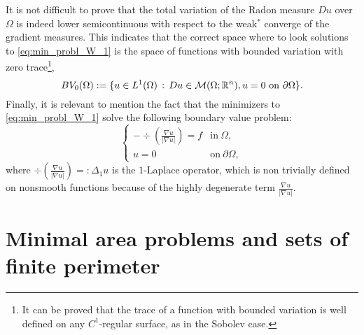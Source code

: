 It is not difficult to prove that the total variation of the Radon measure $Du$ over $\Omega$ is indeed lower semicontinuous with respect to the weak$^*$ converge of the gradient measures. This indicates that the correct space where to look solutions to \eqref{eq:min_probl_W_1} is the space of functions with bounded variation with zero trace\footnote{It can be proved that the trace of a function with bounded variation is well defined on any $C^{1}$-regular surface, as in the Sobolev case.}, 
\begin{equation*}
BV_{0}(\Omega) := \{ u \in L^{1}(\Omega) \, : \, Du \in \mathcal{M}(\Omega; \mathbb{R}^{n}), u = 0 \ \text{on} \ \partial \Omega \}.
\end{equation*}
Finally, it is relevant to mention the fact that the minimizers to \eqref{eq:min_probl_W_1} solve the following boundary value problem:
\begin{equation*}
\begin{cases} 
- \div \left ( \frac{\nabla u}{|\nabla u|} \right ) = f & \text{in} \ \Omega, \\
u = 0 & \text{on} \ \partial \Omega,
\end{cases}
\end{equation*}
where $\div \left ( \frac{\nabla u}{|\nabla u|} \right ) =: \Delta_{1}u$ is the $1$-Laplace operator, which is non trivially defined on nonsmooth functions because of the highly degenerate term $\frac{\nabla u}{|\nabla u|}$.

\section*{Minimal area problems and sets of finite perimeter}

